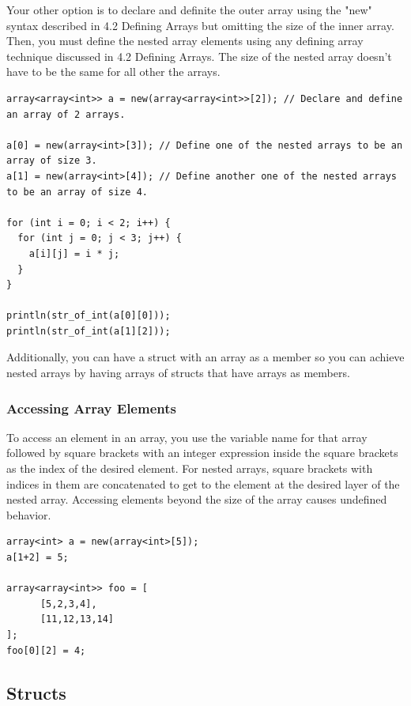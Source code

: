 \documentclass[12pt]{article}
\begin{document}
Your other option is to declare and definite the outer array using the "new" syntax described in 4.2 Defining Arrays but omitting the size of the inner array. Then, you must define the nested array elements using any defining array technique discussed in 4.2 Defining Arrays. The size of the nested array doesn't have to be the same for all other the arrays.

\begin{lstlisting}
array<array<int>> a = new(array<array<int>>[2]); // Declare and define an array of 2 arrays.

a[0] = new(array<int>[3]); // Define one of the nested arrays to be an array of size 3.
a[1] = new(array<int>[4]); // Define another one of the nested arrays to be an array of size 4.

for (int i = 0; i < 2; i++) {
  for (int j = 0; j < 3; j++) {
    a[i][j] = i * j;
  }
}

println(str_of_int(a[0][0]));
println(str_of_int(a[1][2]));
\end{lstlisting}

Additionally, you can have a struct with an array as a member so you can achieve nested arrays by having arrays of structs that have arrays as members.

\subsubsection{Accessing Array Elements}
To access an element in an array, you use the variable name for that array followed by square brackets with an integer expression inside the square brackets as the index of the desired element. For nested arrays, square brackets with indices in them are concatenated to get to the element at the desired layer of the nested array. Accessing elements beyond the size of the array causes undefined behavior. \\
\begin{lstlisting}
array<int> a = new(array<int>[5]);
a[1+2] = 5;

array<array<int>> foo = [
      [5,2,3,4],
      [11,12,13,14]
];
foo[0][2] = 4;
\end{lstlisting}

\subsection{Structs}
\end{document}
